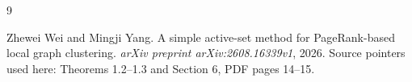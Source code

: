 \begin{thebibliography}{9}

Zhewei Wei and Mingji Yang.
\newblock A simple active-set method for PageRank-based local graph clustering.
\newblock \emph{arXiv preprint arXiv:2608.16339v1}, 2026.
\newblock Source pointers used here: Theorems 1.2--1.3 and Section 6,
PDF pages 14--15.

\end{thebibliography}
